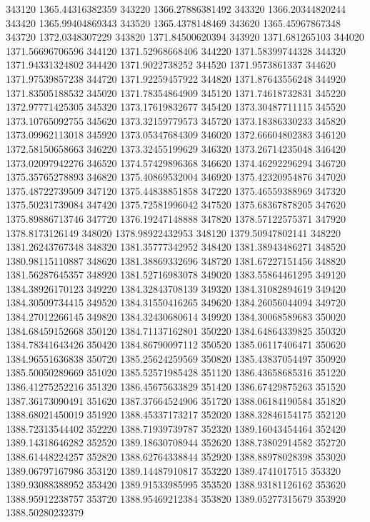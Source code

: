 {343120 1365.44316382359
343220 1366.27886381492
343320 1366.20344820244
343420 1365.99404869343
343520 1365.4378148469
343620 1365.45967867348
343720 1372.0348307229
343820 1371.84500620394
343920 1371.681265103
344020 1371.56696706596
344120 1371.52968668406
344220 1371.58399744328
344320 1371.94331324802
344420 1371.9022738252
344520 1371.9573861337
344620 1371.97539857238
344720 1371.92259457922
344820 1371.87643556248
344920 1371.83505188532
345020 1371.78354864909
345120 1371.74618732831
345220 1372.97771425305
345320 1373.17619832677
345420 1373.30487711115
345520 1373.10765092755
345620 1373.32159779573
345720 1373.18386330233
345820 1373.09962113018
345920 1373.05347684309
346020 1372.66604802383
346120 1372.58150658663
346220 1373.32455199629
346320 1373.26714235048
346420 1373.02097942276
346520 1374.57429896368
346620 1374.46292296294
346720 1375.35765278893
346820 1375.40869532004
346920 1375.42320954876
347020 1375.48722739509
347120 1375.44838851858
347220 1375.46559388969
347320 1375.50231739084
347420 1375.72581996042
347520 1375.68367878205
347620 1375.89886713746
347720 1376.19247148888
347820 1378.57122575371
347920 1378.8173126149
348020 1378.98922432953
348120 1379.50947802141
348220 1381.26243767348
348320 1381.35777342952
348420 1381.38943486271
348520 1380.98115110887
348620 1381.38869332696
348720 1381.67227151456
348820 1381.56287645357
348920 1381.52716983078
349020 1383.55864461295
349120 1384.38926170123
349220 1384.32843708139
349320 1384.31082894619
349420 1384.30509734415
349520 1384.31550416265
349620 1384.26056044094
349720 1384.27012266145
349820 1384.32430680614
349920 1384.30068589683
350020 1384.68459152668
350120 1384.71137162801
350220 1384.64864339825
350320 1384.78341643426
350420 1384.86790097112
350520 1385.06117406471
350620 1384.96551636838
350720 1385.25624259569
350820 1385.43837054497
350920 1385.50050289669
351020 1385.52571985428
351120 1386.43658685316
351220 1386.41275252216
351320 1386.45675633829
351420 1386.67429875263
351520 1387.36173090491
351620 1387.37664524906
351720 1388.06184190584
351820 1388.68021450019
351920 1388.45337173217
352020 1388.32846154175
352120 1388.72313544402
352220 1388.71939739787
352320 1389.16043454464
352420 1389.14318646282
352520 1389.18630708944
352620 1388.73802914582
352720 1388.61448224257
352820 1388.62764338844
352920 1388.88978028398
353020 1389.06797167986
353120 1389.14487910817
353220 1389.4741017515
353320 1389.93088388952
353420 1389.91533985995
353520 1388.93181126162
353620 1388.95912238757
353720 1388.95469212384
353820 1389.05277315679
353920 1388.50280232379
}
